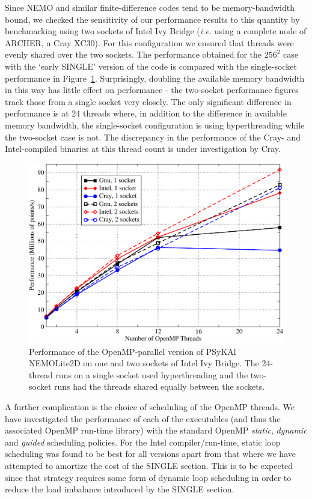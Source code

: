 \documentclass[gmd, manuscript]{copernicus}
\newlength{\picwidth}
\begin{document}
Since NEMO and similar finite-difference codes tend to be
memory-bandwidth bound, we checked the sensitivity of our performance
results to this quantity by benchmarking using two sockets of Intel
Ivy Bridge (\textit{i.e.} using a complete node of ARCHER, a Cray
XC30). For this configuration we ensured that threads were evenly
shared over the two sockets. The performance obtained for the $256^2$
case with the `early SINGLE' version of the code is compared with the
single-socket performance in
Figure~\ref{FIG_omp_2socks}. Surprisingly, doubling the available
memory bandwidth in this way has little effect on performance - the
two-socket performance figures track those from a single socket very
closely. The only significant difference in performance is at 24
threads where, in addition to the difference in available memory
bandwidth, the single-socket configuration is using hyperthreading
while the two-socket case is not.  The discrepancy in the performance
of the Cray- and Intel-compiled binaries at this thread count is under
investigation by Cray.

\begin{figure}
\centering
\includegraphics[width=\picwidth]{1and2sockets}
\caption{Performance of the OpenMP-parallel version of {PS}y{KA}l
  NEMOLite2D on one and two sockets of Intel Ivy Bridge. The 24-thread
  runs on a single socket used hyperthreading and the two-socket runs
  had the threads shared equally between the sockets.}
\label{FIG_omp_2socks}
\end{figure}

A further complication is the choice of scheduling of the OpenMP
threads.  We have investigated the performance of each of the
executables (and thus the associated OpenMP run-time library) with the
standard OpenMP \textit{static}, \textit{dynamic} and \textit{guided}
scheduling policies. For the Intel compiler/run-time, static loop
scheduling was found to be best for all versions apart from that where
we have attempted to amortize the cost of the SINGLE section. This is
to be expected since that strategy requires some form of dynamic loop
scheduling in order to reduce the load imbalance introduced by the
SINGLE section.
\end{document}
